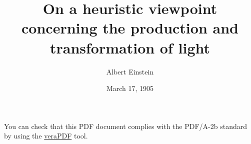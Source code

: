 \documentclass{article}
\title{%
On a heuristic viewpoint concerning the production and
transformation of light}
\author{Albert Einstein}
\date{March 17, 1905}
\begin{document}
  You can check that this PDF document complies with the PDF/A-2b standard by using the \href{https://verapdf.org/}{veraPDF} tool. 

\end{document}
